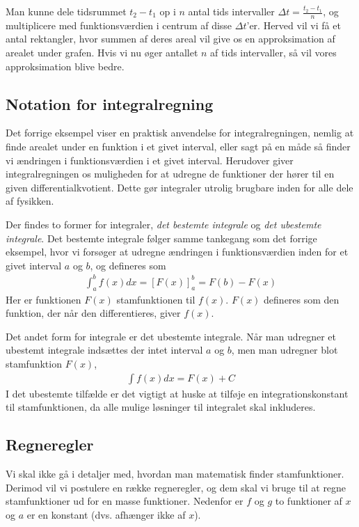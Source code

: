Man kunne dele tidsrummet $t_2 - t_1$ op i $n$ antal tids intervaller 
$\Delta t = \frac{t_2-t_1}{n}$, og multiplicere med funktionsværdien 
i centrum af disse $\Delta t$'er. Herved vil vi få et antal rektangler,
hvor summen af deres areal vil give os en approksimation af arealet under
grafen. Hvis vi nu øger antallet $n$ af tids intervaller, så vil vores
approksimation blive bedre.


\subsection{Notation for integralregning}
Det forrige eksempel viser en praktisk anvendelse for integralregningen,
nemlig at finde arealet under en funktion i et givet interval, eller sagt
på en måde så finder vi ændringen i funktionsværdien i et givet interval.
Herudover giver integralregningen os muligheden for at udregne de funktioner
der hører til en given differentialkvotient. Dette gør integraler utrolig
brugbare inden for alle dele af fysikken.

Der findes to former for integraler, \emph{det bestemte integrale} og \emph{det ubestemte
	integrale}. Det bestemte integrale følger samme tankegang som det forrige eksempel,
hvor vi forsøger at udregne ændringen i funktionsværdien inden for et givet interval
$a$ og $b$, og defineres som
\begin{align*}
\int_{a}^{b} f(x) dx = [F(x)]_{a}^{b} = F(b) - F(x)
\end{align*}
Her er funktionen $F(x)$ stamfunktionen til $f(x)$. $F(x)$ defineres som den funktion,
der når den differentieres, giver $f(x)$.

Det andet form for integrale er det ubestemte integrale. Når man udregner et ubestemt
integrale indsættes der intet interval $a$ og $b$, men man udregner blot stamfunktion $F(x)$,
\begin{align*}
\int f(x) dx = F(x) + C
\end{align*}
I det ubestemte tilfælde er det vigtigt at huske at tilføje en integrationskonstant til
stamfunktionen, da alle mulige løsninger til integralet skal inkluderes.

\subsection{Regneregler}
Vi skal ikke gå i detaljer med, hvordan man matematisk finder
stamfunktioner. Derimod vil vi postulere en række regneregler,
og dem skal vi bruge til at regne stamfunktioner ud for en
masse funktioner. Nedenfor er $f$ og $g$ to funktioner af $x$ og $a$ er en
konstant (dvs. afhænger ikke af $x$).

